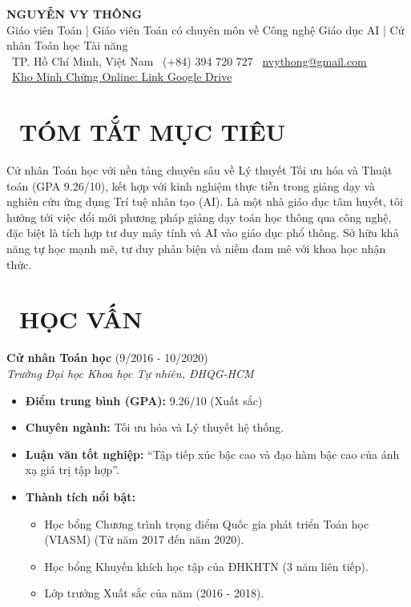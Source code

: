 \documentclass[11pt,a4paper]{article}
\begin{document}
\begin{center}
    {\Huge\bfseries\color{primary} NGUYỄN VY THÔNG}\\[5pt]
    {\Large Giáo viên Toán | Giáo viên Toán có chuyên môn về Công nghệ Giáo dục AI | Cử nhân Toán học Tài năng}\\[10pt]
    \faMapMarker*~TP. Hồ Chí Minh, Việt Nam \quad
    \faPhone~(+84) 394 720 727 \quad
    \faEnvelope~\href{mailto:nvythong@gmail.com}{nvythong@gmail.com}\\[5pt]
    \faLink~\href{https://drive.google.com/drive/folders/1tL5VO2r13Qb-Fy3bYrKF97-6ZKrWLgaq?usp=drive_link}{Kho Minh Chứng Online: Link Google Drive}
\end{center}

\section{\faClipboardList~TÓM TẮT MỤC TIÊU}
Cử nhân Toán học với nền tảng chuyên sâu về Lý thuyết Tối ưu hóa và Thuật toán (GPA 9.26/10), kết hợp với kinh nghiệm thực tiễn trong giảng dạy và nghiên cứu ứng dụng Trí tuệ nhân tạo (AI). 
Là một nhà giáo dục tâm huyết, tôi hướng tới việc đổi mới phương pháp giảng dạy toán học thông qua công nghệ, đặc biệt là tích hợp tư duy máy tính và AI vào giáo dục phổ thông. Sở hữu khả năng tự học mạnh mẽ, tư duy phản biện và niềm đam mê với khoa học nhận thức.

\section{\faGraduationCap~HỌC VẤN}

\textbf{Cử nhân Toán học} \hfill (9/2016 - 10/2020)\\
\textit{Trường Đại học Khoa học Tự nhiên, ĐHQG-HCM}
\begin{itemize}
    \item \textbf{Điểm trung bình (GPA):} 9.26/10 (Xuất sắc)
    \item \textbf{Chuyên ngành:} Tối ưu hóa và Lý thuyết hệ thống.
    \item \textbf{Luận văn tốt nghiệp:} ``Tập tiếp xúc bậc cao và đạo hàm bậc cao của ánh xạ giá trị tập hợp''.
    \item \textbf{Thành tích nổi bật:}
    \begin{itemize}
        \item Học bổng Chương trình trọng điểm Quốc gia phát triển Toán học (VIASM) (Từ năm 2017 đến năm 2020).
        \item Học bổng Khuyến khích học tập của ĐHKHTN (3 năm liên tiếp).
        \item Lớp trưởng Xuất sắc của năm (2016 - 2018).
    \end{itemize}
\end{itemize}
\end{document}
